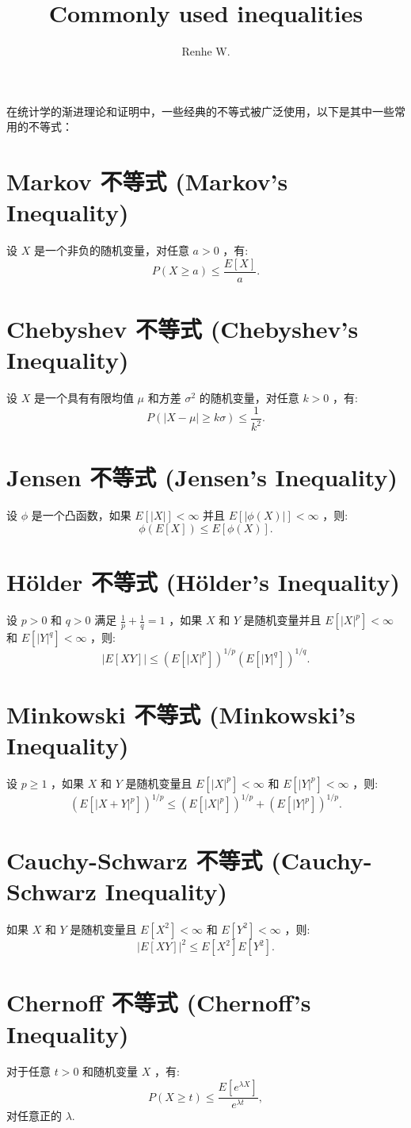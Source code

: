 \documentclass[UTF8,12pt]{ctexart}
\title{Commonly used inequalities}
\author{Renhe W.}
\date{ }
\numberwithin{equation}{section}%
\begin{document}
	\maketitle
	在统计学的渐进理论和证明中，一些经典的不等式被广泛使用，以下是其中一些常用的不等式：
	\section{ Markov 不等式 (Markov's Inequality)}
	设 $X$ 是一个非负的随机变量，对任意 $a>0$ ，有:
	$$
	P(X \geq a) \leq \frac{E[X]}{a}.
	$$
	\section{Chebyshev 不等式 (Chebyshev's Inequality)}
	设 $X$ 是一个具有有限均值 $\mu$ 和方差 $\sigma^2$ 的随机变量，对任意 $k>0$ ，有:
	$$
	P(|X-\mu| \geq k \sigma) \leq \frac{1}{k^2}.
	$$
	\section{Jensen 不等式 (Jensen's Inequality)}
	设 $\phi$ 是一个凸函数，如果 $E[|X|]<\infty$ 并且 $E[|\phi(X)|]<\infty$ ，则:
	$$
	\phi(E[X]) \leq E[\phi(X)].
	$$
	\section{Hölder 不等式 (Hölder's Inequality)}
	设 $p>0$ 和 $q>0$ 满足 $\frac{1}{p}+\frac{1}{q}=1$ ，如果 $X$ 和 $Y$ 是随机变量并且 $E\left[|X|^p\right]<\infty$ 和 $E\left[|Y|^q\right]<\infty$ ，则:
	$$
	|E[X Y]| \leq\left(E\left[|X|^p\right]\right)^{1 / p}\left(E\left[|Y|^q\right]\right)^{1 / q}.
	$$
	\section{ Minkowski 不等式 (Minkowski's Inequality)}
	设 $p \geq 1$ ，如果 $X$ 和 $Y$ 是随机变量且 $E\left[|X|^p\right]<\infty$ 和 $E\left[|Y|^p\right]<\infty$ ，则:
	$$
	\left(E\left[|X+Y|^p\right]\right)^{1 / p} \leq\left(E\left[|X|^p\right]\right)^{1 / p}+\left(E\left[|Y|^p\right]\right)^{1 / p}.
	$$
	\section{Cauchy-Schwarz 不等式 (Cauchy-Schwarz Inequality)} 
	
	如果 $X$ 和 $Y$ 是随机变量且 $E\left[X^2\right]<\infty$ 和 $E\left[Y^2\right]<\infty$ ，则:
	$$
	|E[X Y]|^2 \leq E\left[X^2\right] E\left[Y^2\right].
	$$
	\section{Chernoff 不等式 (Chernoff's Inequality)} 
	
	对于任意 $t>0$ 和随机变量 $X$ ，有:
	$$
	P(X \geq t) \leq \frac{E\left[e^{\lambda X}\right]}{e^{\lambda t}},
	$$
	对任意正的 $\lambda$.

	
\end{document}
